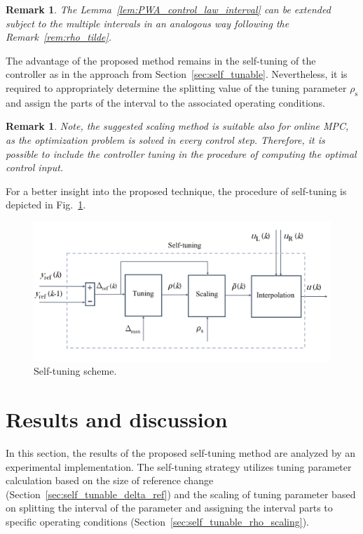 \documentclass[preprint,12pt]{elsarticle}
\newtheorem{remark}[theorem]{Remark}
\begin{document}
	\begin{remark}
		The Lemma~\ref{lem:PWA_control_law_interval} can be extended subject to the multiple intervals in an analogous way following the Remark~\ref{rem:rho_tilde}.
	\end{remark}

	The advantage of the proposed method remains in the self-tuning of the controller as in the approach from Section~\ref{sec:self_tunable}. Nevertheless, it is required to appropriately determine the splitting value of the tuning parameter $\rho_{\mathrm{s}}$ and assign the parts of the interval to the associated operating conditions.
		
	\begin{remark}
		Note, the suggested scaling method is suitable also for online MPC, as the optimization problem is solved in every control step. Therefore, it is possible to include the controller tuning in the procedure of computing the optimal control input.   
	\end{remark}

	For a better insight into the proposed technique, the procedure of self-tuning is depicted in Fig.~\ref{fig:tuning}.

	\begin{figure}
	\begin{center}
		\includegraphics[width=\textwidth]{images/tuning}
		\caption[Self-tuning scheme]{Self-tuning scheme.}
		\label{fig:tuning}
	\end{center}
	\end{figure}

	
	\section{Results and discussion}
\label{sec:results}

In this section, the results of the proposed self-tuning method are analyzed by an experimental implementation. The self-tuning strategy utilizes tuning parameter calculation based on the size of reference change (Section~\ref{sec:self_tunable_delta_ref}) and the scaling of tuning parameter based on splitting the interval of the parameter and assigning the interval parts to specific operating conditions (Section~\ref{sec:self_tunable_rho_scaling}).
\end{document}
